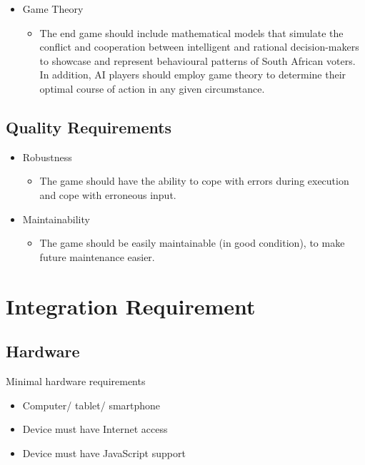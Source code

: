 \documentclass{article}
\begin{document}
\begin{itemize}
	    \item Game Theory 
		\begin{itemize}
			\item The end game should include mathematical models that simulate the conflict and cooperation between intelligent and rational decision-makers to showcase and represent behavioural patterns of South African voters. In addition, AI players should employ game theory to determine their optimal course of action in any given circumstance.
	    \end{itemize}
   
   \end{itemize}
   \subsection{Quality Requirements} 
   \begin{itemize}
    \item Robustness
		\begin{itemize}
			\item The game should have the ability to cope with errors during execution and cope with erroneous input.
	    		
	    \end{itemize}
	    
	    \item Maintainability
		\begin{itemize}
			\item The game should be easily maintainable (in good condition), to make future maintenance easier.
         \end{itemize}
        \end{itemize}
   
  \section{Integration Requirement}
    \subsection{Hardware}
    Minimal hardware requirements
	\begin{itemize}
		\item Computer/ tablet/ smartphone 
		\item Device must have Internet access
		\item Device must have JavaScript support
	\end{itemize}
\end{document}
